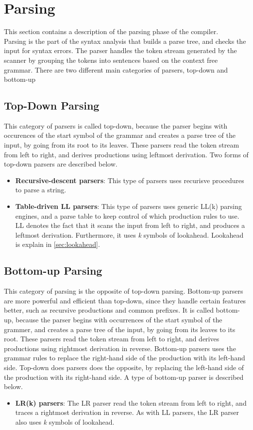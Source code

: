 \section{Parsing}
This section contains a description of the parsing phase of the compiler. 
\\Parsing is the part of the syntax analysis that builds a parse tree, and checks the input for syntax errors. The parser handles the token stream generated by the scanner by grouping the tokens into sentences based on the context free grammar. There are two different main categories of parsers, top-down and bottom-up

\subsection{Top-Down Parsing}
This category of parsers is called top-down, because the parser begins with occurences of the start symbol of the grammar and creates a parse tree of the input, by going from its root to its leaves. These parsers read the token stream from left to right, and derives productions using leftmost derivation. Two forms of top-down parsers are described below. 

\begin{itemize}
\item \textbf{Recursive-descent parsers}: This type of parsers uses recurisve procedures to parse a string. 
\item \textbf{Table-driven LL parsers}: This type of parsers uses generic LL(k) parsing engines, and a parse table to keep control of which production rules to use. LL denotes the fact that it scans the input from left to right, and produces a leftmost derivation. Furthermore, it uses \textit{k} symbols of lookahead. Lookahead is explain in \ref{sec:lookahead}.
\end{itemize}

\subsection{Bottom-up Parsing}
This category of parsing is the opposite of top-down parsing. Bottom-up parsers are more powerful and efficient than top-down, since they handle certain features better, such as recursive productions and common prefixes. It is called bottom-up, because the parser begins with occurrences of the start symbol of the grammer, and creates a parse tree of the input, by going from its leaves to its root. These parsers read the token stream from left to right, and derives productions using rightmost derivation in reverse. Bottom-up parsers uses the grammar rules to replace the right-hand side of the production with its left-hand side. Top-down does parsers does the opposite, by replacing the left-hand side of the production with its right-hand side. A type of bottom-up parser is described below. 

\begin{itemize}
\item \textbf{LR(k) parsers}: The LR parser read the token stream from left to right, and traces a rightmost derivation in reverse. As with LL parsers, the LR parser also uses \textit{k} symbols of lookahead.  
\end{itemize}
